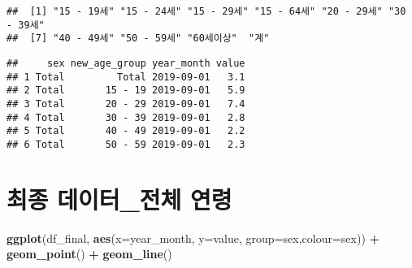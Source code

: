 \documentclass[]{article}
\newenvironment{Shaded}{\begin{snugshade}}{\end{snugshade}}
\newcommand{\DataTypeTok}[1]{\textcolor[rgb]{0.13,0.29,0.53}{#1}}
\newcommand{\KeywordTok}[1]{\textcolor[rgb]{0.13,0.29,0.53}{\textbf{#1}}}
\newcommand{\NormalTok}[1]{#1}
\newcommand{\OperatorTok}[1]{\textcolor[rgb]{0.81,0.36,0.00}{\textbf{#1}}}
\newcommand{\StringTok}[1]{\textcolor[rgb]{0.31,0.60,0.02}{#1}}
\begin{document}
\begin{verbatim}
##  [1] "15 - 19세" "15 - 24세" "15 - 29세" "15 - 64세" "20 - 29세" "30 - 39세"
##  [7] "40 - 49세" "50 - 59세" "60세이상"  "계"
\end{verbatim}

\begin{Shaded}
\end{Shaded}

\begin{verbatim}
##     sex new_age_group year_month value
## 1 Total         Total 2019-09-01   3.1
## 2 Total       15 - 19 2019-09-01   5.9
## 3 Total       20 - 29 2019-09-01   7.4
## 4 Total       30 - 39 2019-09-01   2.8
## 5 Total       40 - 49 2019-09-01   2.2
## 6 Total       50 - 59 2019-09-01   2.3
\end{verbatim}

\hypertarget{uxcd5cuxc885-uxb370uxc774uxd130_uxc804uxccb4-uxc5f0uxb839}{%
\section{최종 데이터\_전체
연령}\label{uxcd5cuxc885-uxb370uxc774uxd130_uxc804uxccb4-uxc5f0uxb839}}

\begin{Shaded}
\begin{Highlighting}[]
\KeywordTok{ggplot}\NormalTok{(df_final, }\KeywordTok{aes}\NormalTok{(}\DataTypeTok{x=}\NormalTok{year_month, }\DataTypeTok{y=}\NormalTok{value, }\DataTypeTok{group=}\NormalTok{sex,}\DataTypeTok{colour=}\NormalTok{sex)) }\OperatorTok{+}\StringTok{ }\KeywordTok{geom_point}\NormalTok{() }\OperatorTok{+}\StringTok{ }\KeywordTok{geom_line}\NormalTok{()}
\end{Highlighting}
\end{Shaded}
\end{document}
